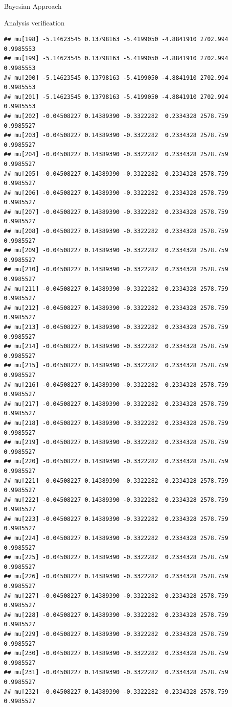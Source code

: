 \documentclass[
  ignorenonframetext,
]{beamer}
\begin{document}
\begin{frame}[fragile]{Bayesian Approach}
\begin{block}{Analysis verification}
\begin{verbatim}
## mu[198] -5.14623545 0.13798163 -5.4199050 -4.8841910 2702.994 0.9985553
## mu[199] -5.14623545 0.13798163 -5.4199050 -4.8841910 2702.994 0.9985553
## mu[200] -5.14623545 0.13798163 -5.4199050 -4.8841910 2702.994 0.9985553
## mu[201] -5.14623545 0.13798163 -5.4199050 -4.8841910 2702.994 0.9985553
## mu[202] -0.04508227 0.14389390 -0.3322282  0.2334328 2578.759 0.9985527
## mu[203] -0.04508227 0.14389390 -0.3322282  0.2334328 2578.759 0.9985527
## mu[204] -0.04508227 0.14389390 -0.3322282  0.2334328 2578.759 0.9985527
## mu[205] -0.04508227 0.14389390 -0.3322282  0.2334328 2578.759 0.9985527
## mu[206] -0.04508227 0.14389390 -0.3322282  0.2334328 2578.759 0.9985527
## mu[207] -0.04508227 0.14389390 -0.3322282  0.2334328 2578.759 0.9985527
## mu[208] -0.04508227 0.14389390 -0.3322282  0.2334328 2578.759 0.9985527
## mu[209] -0.04508227 0.14389390 -0.3322282  0.2334328 2578.759 0.9985527
## mu[210] -0.04508227 0.14389390 -0.3322282  0.2334328 2578.759 0.9985527
## mu[211] -0.04508227 0.14389390 -0.3322282  0.2334328 2578.759 0.9985527
## mu[212] -0.04508227 0.14389390 -0.3322282  0.2334328 2578.759 0.9985527
## mu[213] -0.04508227 0.14389390 -0.3322282  0.2334328 2578.759 0.9985527
## mu[214] -0.04508227 0.14389390 -0.3322282  0.2334328 2578.759 0.9985527
## mu[215] -0.04508227 0.14389390 -0.3322282  0.2334328 2578.759 0.9985527
## mu[216] -0.04508227 0.14389390 -0.3322282  0.2334328 2578.759 0.9985527
## mu[217] -0.04508227 0.14389390 -0.3322282  0.2334328 2578.759 0.9985527
## mu[218] -0.04508227 0.14389390 -0.3322282  0.2334328 2578.759 0.9985527
## mu[219] -0.04508227 0.14389390 -0.3322282  0.2334328 2578.759 0.9985527
## mu[220] -0.04508227 0.14389390 -0.3322282  0.2334328 2578.759 0.9985527
## mu[221] -0.04508227 0.14389390 -0.3322282  0.2334328 2578.759 0.9985527
## mu[222] -0.04508227 0.14389390 -0.3322282  0.2334328 2578.759 0.9985527
## mu[223] -0.04508227 0.14389390 -0.3322282  0.2334328 2578.759 0.9985527
## mu[224] -0.04508227 0.14389390 -0.3322282  0.2334328 2578.759 0.9985527
## mu[225] -0.04508227 0.14389390 -0.3322282  0.2334328 2578.759 0.9985527
## mu[226] -0.04508227 0.14389390 -0.3322282  0.2334328 2578.759 0.9985527
## mu[227] -0.04508227 0.14389390 -0.3322282  0.2334328 2578.759 0.9985527
## mu[228] -0.04508227 0.14389390 -0.3322282  0.2334328 2578.759 0.9985527
## mu[229] -0.04508227 0.14389390 -0.3322282  0.2334328 2578.759 0.9985527
## mu[230] -0.04508227 0.14389390 -0.3322282  0.2334328 2578.759 0.9985527
## mu[231] -0.04508227 0.14389390 -0.3322282  0.2334328 2578.759 0.9985527
## mu[232] -0.04508227 0.14389390 -0.3322282  0.2334328 2578.759 0.9985527

\end{verbatim}
\end{block}
\end{frame}
\end{document}
